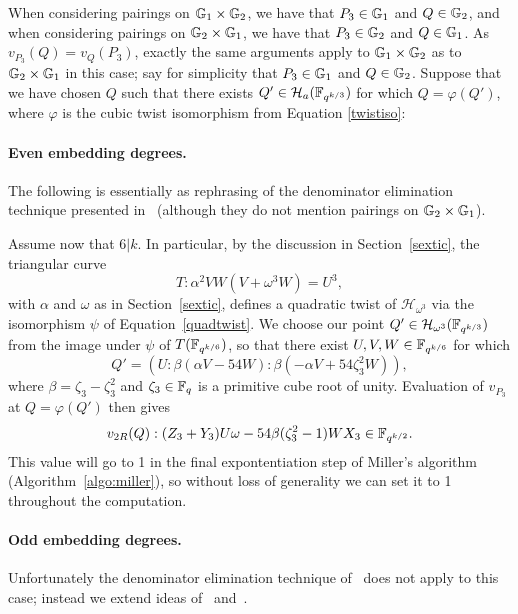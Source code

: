 When considering pairings on $\mathbb{G}_{1} \times \mathbb{G}_{2}$, we have that $P_3 \in \mathbb{G}_{1}$ and $Q \in \mathbb{G}_{2}$, and when considering pairings on $\mathbb{G}_{2} \times \mathbb{G}_{1}$, we have that $P_3 \in \mathbb{G}_{2}$ and $Q \in \mathbb{G}_{1}$.
As $v_{P_3}(Q) = v_{Q}(P_3)$, exactly the same arguments apply to $\mathbb{G}_{1} \times \mathbb{G}_{2}$ as to $\mathbb{G}_{2} \times \mathbb{G}_{1}$ in this case; 
say for simplicity that $P_3 \in \mathbb{G}_{1}$ and $Q \in \mathbb{G}_{2}$.
Suppose that we have chosen $Q$ such that there exists $Q' \in \mathcal{H}_a(\mathbb{F}_{q^{k/3}})$ for which $Q = \varphi(Q')$, where $\varphi$ is the 
cubic twist isomorphism from Equation \eqref{twistiso}:

\paragraph*{Even embedding degrees.}

The following is essentially as rephrasing of the denominator elimination technique presented in~\cite{2010/Gu} (although they do not mention pairings on $\mathbb{G}_{2} \times \mathbb{G}_{1}$).

Assume now that $6|k$. In particular, by the discussion in
Section~\ref{sextic}, the triangular curve
\[T:\alpha^2VW(V + \omega^3W) = U^3,\]
with $\alpha$ and $\omega$ as in Section~\ref{sextic},
defines a quadratic twist of $\mathcal{H}_{\omega^3}$ via the isomorphism
$\psi$ of Equation~\eqref{quadtwist}.
We choose our point $Q' \in \mathcal{H}_{\omega^3}(\mathbb{F}_{q^{k/3}})$ from the
image under $\psi$ of $T(\mathbb{F}_{q^{k/6}})$, so that there exist $U, V, W \in \mathbb{F}_{q^{k/6}}$ for which
$$Q' = (U:\beta(\alpha V - 54W) : \beta(-\alpha V + 54\zeta_3^2 W)),$$
where $\beta = \zeta_3-\zeta_3^2$ and 
$\zeta_3 \in \mathbb{F}_{q}$ is a primitive cube root of unity.
Evaluation of $v_{P_3}$ at $Q = \varphi(Q')$ then gives
\[v_{2R}(Q) : (Z_3 + Y_3) U\omega - 54\beta(\zeta_3^2-1)W X_3 \in \mathbb{F}_{q^{k/2}}.\]
This value will go to 1 in the final expontentiation step of Miller's algorithm 
(Algorithm~\ref{algo:miller}), so without loss of generality we can set it to 1 throughout the computation.

\paragraph*{Odd embedding degrees.}

Unfortunately the denominator elimination technique of~\cite{2010/Gu} does not apply to this case;
instead we extend ideas of~\cite{2008/lin} and~\cite{2009/deg15}.

